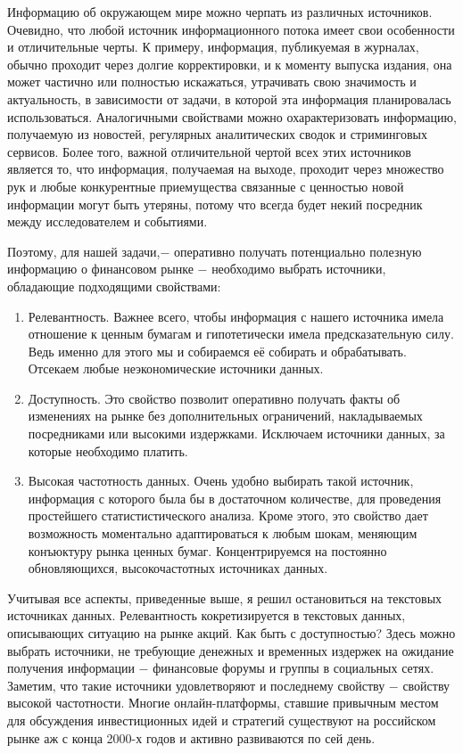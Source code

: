\documentclass{article}
\begin{document}
Информацию об окружающем мире можно черпать из различных источников. Очевидно, что любой источник информационного потока имеет свои особенности и отличительные черты. К примеру, информация, публикуемая в журналах, обычно проходит через долгие корректировки, и к моменту выпуска издания, она может частично или полностью искажаться, утрачивать свою значимость и актуальность, в зависимости от задачи, в которой эта информация планировалась использоваться. Аналогичными свойствами можно охарактеризовать информацию, получаемую из новостей, регулярных аналитических сводок и стриминговых сервисов. Более того, важной отличительной чертой всех этих источников является то, что информация, получаемая на выходе, проходит через множество рук и любые конкурентные приемущества связанные с ценностью новой информации могут быть утеряны, потому что всегда будет некий посредник между исследователем и событиями.  
\par Поэтому, для нашей задачи,$-$ оперативно получать потенциально полезную информацию о финансовом рынке $-$ необходимо выбрать источники, обладающие подходящими свойствами:

\begin{enumerate}
	\item Релевантность. Важнее всего, чтобы информация с нашего источника имела отношение к ценным бумагам и гипотетически имела предсказательную силу. Ведь именно для этого мы и собираемся её собирать и обрабатывать. Отсекаем любые неэкономические источники данных.
	\item Доступность. Это свойство позволит оперативно получать факты об изменениях на рынке без дополнительных ограничений, накладываемых посредниками или высокими издержками.  Исключаем источники данных, за которые необходимо платить. 
	\item Высокая частотность данных. Очень удобно выбирать такой источник, информация с которого была бы в достаточном количестве, для проведения простейшего статистистического анализа. Кроме этого, это свойство дает возможность моментально адаптироваться к любым шокам, меняющим конъюктуру рынка ценных бумаг. Концентрируемся на постоянно обновляющихся, высокочастотных источниках данных.
\end{enumerate}
Учитывая все аспекты, приведенные выше, я решил остановиться на текстовых источниках данных. Релевантность кокретизируется в текстовых данных, описывающих ситуацию на рынке акций. Как быть с доступностью? Здесь можно выбрать источники, не требующие денежных и временных издержек на ожидание получения информации $-$ финансовые форумы и группы в социальных сетях. Заметим, что такие источники удовлетворяют и последнему свойству $-$ свойству высокой частотности. Многие онлайн-платформы, ставшие привычным местом для обсуждения инвестиционных идей и стратегий существуют на российском рынке аж с конца 2000-х годов и активно развиваются по сей день.
\end{document}
